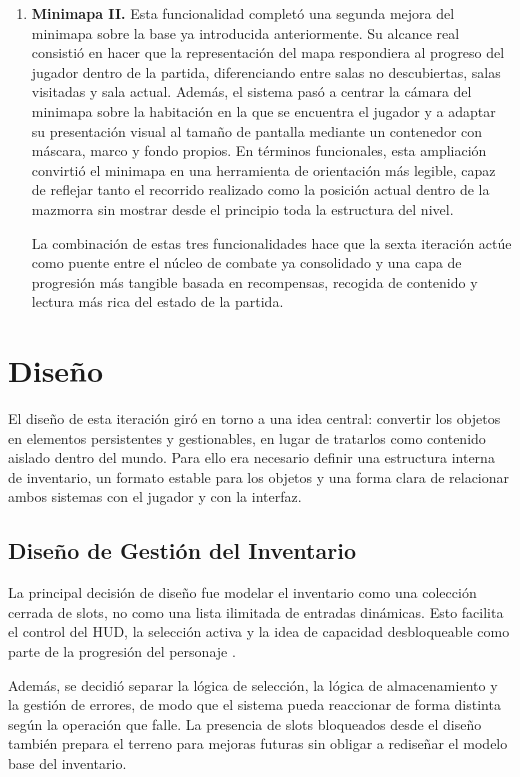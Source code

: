 \begin{enumerate}
\item \textbf{Minimapa II.} Esta funcionalidad completó una segunda mejora del minimapa sobre la
base ya introducida anteriormente. Su alcance real consistió en hacer que la representación
del mapa respondiera al progreso del jugador dentro de la partida, diferenciando entre salas
no descubiertas, salas visitadas y sala actual. Además, el sistema pasó a centrar la cámara
del minimapa sobre la habitación en la que se encuentra el jugador y a adaptar su
presentación visual al tamaño de pantalla mediante un contenedor con máscara, marco y fondo
propios. En términos funcionales, esta ampliación convirtió el minimapa en una herramienta
de orientación más legible, capaz de reflejar tanto el recorrido realizado como la posición
actual dentro de la mazmorra sin mostrar desde el principio toda la estructura del nivel.

La combinación de estas tres funcionalidades hace que la sexta iteración actúe como puente
entre el núcleo de combate ya consolidado y una capa de progresión más tangible basada en
recompensas, recogida de contenido y lectura más rica del estado de la partida.

\end{enumerate}

\section{Diseño}
El diseño de esta iteración giró en torno a una idea central: convertir los objetos en
elementos persistentes y gestionables, en lugar de tratarlos como contenido aislado dentro
del mundo. Para ello era necesario definir una estructura interna de inventario, un formato
estable para los objetos y una forma clara de relacionar ambos sistemas con el jugador y con
la interfaz.

\subsection{Diseño de Gestión del Inventario}
La principal decisión de diseño fue modelar el inventario como una colección cerrada de
slots, no como una lista ilimitada de entradas dinámicas. Esto facilita el control del HUD,
la selección activa y la idea de capacidad desbloqueable como parte de la progresión del
personaje \cite{rumpledcodeInventory}.

Además, se decidió separar la lógica de selección, la lógica de almacenamiento y la gestión
de errores, de modo que el sistema pueda reaccionar de forma distinta según la operación que
falle. La presencia de slots bloqueados desde el diseño también prepara el terreno para
mejoras futuras sin obligar a rediseñar el modelo base del inventario.

